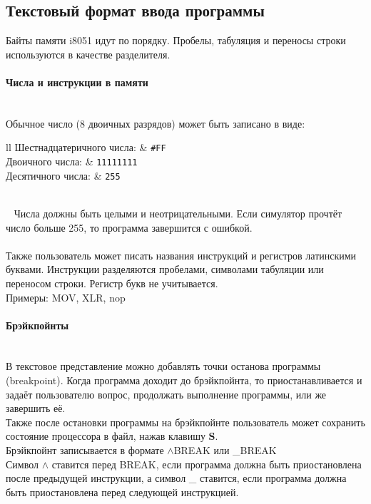 \subsection{Текстовый формат ввода программы}
Байты памяти i8051 идут по порядку. Пробелы, табуляция и переносы строки используются в качестве разделителя.

\paragraph{Числа и инструкции в памяти}~\\
Обычное число (8 двоичных разрядов) может быть записано в виде:
~
~\\[3mm]
\begin{tabular}{{l}{l}}
	Шестнадцатеричного числа: & {\tt\large \#FF} \\[2mm]
	Двоичного числа:          & {\tt\large 11111111} \\[2mm]
	Десятичного числа:        & {\tt\large *255} \\
\end{tabular} \\[3mm]
~
Числа должны быть целыми и неотрицательными. Если симулятор прочтёт число больше 255, то программа завершится с ошибкой.\\
~\\
Также пользователь может писать названия инструкций и регистров латинскими буквами. Инструкции разделяются пробелами, символами табуляции или переносом строки. Регистр букв не учитывается.\\
Примеры: MOV, XLR, nop

\paragraph{Брэйкпойнты}~\\
В текстовое представление можно добавлять точки останова программы (breakpoint). Когда программа доходит до брэйкпойнта, то приостанавливается и задаёт пользователю вопрос, продолжать выполнение программы, или же завершить её.\\
Также после остановки программы на брэйкпойнте пользователь может сохранить состояние процессора в файл, нажав клавишу \textbf{S}. \\
Брэйкпойнт записывается в формате $\wedge$BREAK или \_BREAK \\
Символ $\wedge$ ставится перед BREAK, если программа должна быть приостановлена после предыдущей инструкции, а символ \_ ставится, если программа должна быть приостановлена перед следующей инструкцией.

